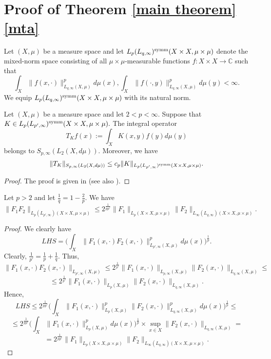 \documentclass{amsart}
\numberwithin{equation}{section}
\begin{document}
\section{Proof of Theorem \ref{main theorem} \eqref{mta}}\label{upper estimate section}

Let $(X,\mu)$ be a measure space and let $L_p(L_{q,\infty})^{\rm symm}(X\times X,\mu\times\mu)$ denote the mixed-norm space consisting of all $\mu\times\mu$-measurable functions $f:X\times X \to \mathbb{C}$ such that
$$\int_X\|f(x,\cdot)\|_{L_{q,\infty}(X,\mu)}^pd\mu(x),\int_X\|f(\cdot,y)\|_{L_{q,\infty}(X,\mu)}^pd\mu(y)<\infty.$$
We equip $L_p(L_{q,\infty})^{\rm symm}(X\times X,\mu\times\mu)$ with its natural norm.

\begin{lemma}\label{Russo}
Let $(X,\mu)$ be a measure space and let $2<p<\infty.$ Suppose that $K\in L_p(L_{p',\infty})^{\rm symm}(X\times X,\mu\times\mu).$ The integral operator
$$T_Kf(x):=\int_X K(x,y)f(y)d\mu(y)$$
belongs to $S_{p,\infty}(L_2(X,d\mu)).$ Moreover, we have
$$\|T_K\|_{S_{p,\infty}(L_2(X,d\mu))}\leq c_p \|K\|_{L_p(L_{p',\infty})^{\rm symm}(X\times X,\mu\times\mu)}.$$
\end{lemma}
\begin{proof}
The proof is given in \cite[Lemma 2]{JW} (see also \cite[Corollary 11.2]{HKarxiv}).
\end{proof}

\begin{lemma}\label{s4 holder lemma} Let $p>2$ and let $\frac1q=1-\frac2p.$ We have $$\|F_1F_2\|_{L_p(L_{p',\infty})(X\times X,\mu\times\mu)}\leq 2^{\frac1{pp'}}\|F_1\|_{L_p(X\times X,\mu\times\mu)}\|F_2\|_{L_{\infty}(L_{q,\infty})(X\times X,\mu\times\mu)}.$$
\end{lemma}
\begin{proof} We clearly have
$$LHS=\Big(\int_X\|F_1(x,\cdot)F_2(x,\cdot)\|_{L_{p',\infty}(X,\mu)}^pd\mu(x)\Big)^{\frac1p}.$$
Clearly, $\frac1{p'}=\frac1p+\frac1q.$ Thus,
$$\|F_1(x,\cdot)F_2(x,\cdot)\|_{L_{p',\infty}(X,\mu)}
\leq 2^{\frac1{p'}}\|F_1(x,\cdot)\|_{L_{p,\infty}(X,\mu)}\|F_2(x,\cdot)\|_{L_{q,\infty}(X,\mu)}\leq$$
$$\leq 2^{\frac1{p'}}\|F_1(x,\cdot)\|_{L_p(X,\mu)}\|F_2(x,\cdot)\|_{L_{q,\infty}(X,\mu)}.$$
Hence,
$$LHS\leq 2^{\frac1{pp'}}\Big(\int_X\|F_1(x,\cdot)\|_{L_p(X,\mu)}^p\|F_2(x,\cdot)\|_{L_{q,\infty}(X,\mu)}^pd\mu(x)\Big)^{\frac1p}\leq$$
$$\leq 2^{\frac1{pp'}}\Big(\int_X\|F_1(x,\cdot)\|_{L_p(X,\mu)}^pd\mu(x)\Big)^{\frac1p}\times\sup_{x\in X}\|F_2(x,\cdot)\|_{L_{q,\infty}(X,\mu)}=$$
$$=2^{\frac1{pp'}}\|F_1\|_{L_p(X\times X,\mu\times\mu)}\|F_2\|_{L_{\infty}(L_{q,\infty})(X\times X,\mu\times\mu)}.$$
\end{proof}
\end{document}
